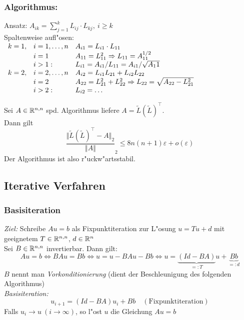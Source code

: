 \documentclass{scrartcl}
\begin{document}
\subsubsection*{Algorithmus:}
Ansatz: $A_{ik} = \sum\limits_{j=1}^k L_{ij} \cdot L_{kj}, \ i \geq k$ \\
Spaltenweise aufl"osen: \\
$\begin{array}{l l l}
k=1, & i=1, \ldots, n & A_{i1} = L_{i1} \cdot L_{11} \\
     & i=1            & A_{11} = L_{11}^2 \Rightarrow L_{11} = A_{11}^{1/2} \\
     & i> 1:          & L_{i1} = A_{i1} / L_{11} = A_{i1} / \sqrt{A_11} \\
k=2, & i=2, \ldots, n & A_{i2} = L_{i1}L_{21} + L_{i2}L_{22} \\
     & i=2            & A_{22} = L_{21}^2 + L_{22}^2 \Rightarrow L_{22} = \sqrt{A_{22} - L_{21}^2} \\
     & i> 2:          & L_{i2} = \ldots
\end{array}$

\begin{Satz} Sei $A \in \mathbb{R}^{n,n}$ spd. Algorithmus liefere $A = \tilde L (\tilde L ) ^\top$. \\
Dann gilt
$$ \frac{ \Vert \tilde L (\tilde L ) ^\top - A \Vert_2 }{\Vert A \Vert }_2 \leq 8 n(n+1) \varepsilon + o(\varepsilon) $$
Der Algorithmus ist also r"uckw"artsstabil.
\end{Satz}

\subsection{Iterative Verfahren}

\subsubsection{Basisiteration}

\emph{Ziel:} Schreibe $Au = b$ als Fixpunktiteration zur L"osung $u = Tu + d$ mit geeignetem $T \in \mathbb{R}^{n,n}$, $d \in \mathbb{R}^n$ \\
Sei $B \in \mathbb{R}^{n,n}$ invertierbar. Dann gilt:
$$Au = b \Leftrightarrow  BAu = Bb \Leftrightarrow u = u - BAu - Bb \Leftrightarrow u = \underbrace{(Id - BA)}_{=: T} u + \underbrace{Bb}_{=: d}$$
$B$ nennt man \emph{Vorkonditionierung} (dient der Beschleunigung des folgenden Algorithmus) \\
\emph{Basisiteration:} 
$$u_{i+1} = (Id - BA) u_i + Bb \quad (\mathrm{Fixpunktiteration})$$
Falls $u_i \rightarrow u \ (i \rightarrow \infty)$, so l"ost $u$ die Gleichung $Au = b$
\end{document}
